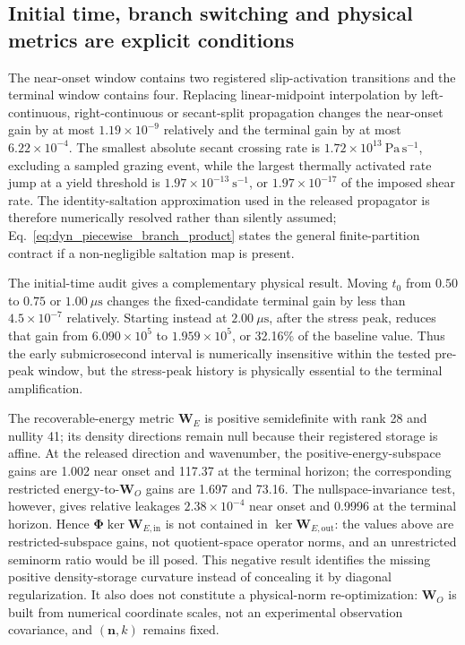 \subsection{Initial time, branch switching and physical metrics are explicit conditions}

The near-onset window contains two registered slip-activation transitions and
the terminal window contains four.  Replacing linear-midpoint interpolation by
left-continuous, right-continuous or secant-split propagation changes the
near-onset gain by at most $1.19\times10^{-9}$ relatively and the terminal
gain by at most $6.22\times10^{-4}$.  The smallest absolute secant crossing
rate is $1.72\times10^{13}~\mathrm{Pa\,s^{-1}}$, excluding a sampled grazing
event, while the largest thermally activated rate jump at a yield threshold is
$1.97\times10^{-13}~\mathrm{s^{-1}}$, or $1.97\times10^{-17}$ of the imposed
shear rate.  The identity-saltation approximation used in the released
propagator is therefore numerically resolved rather than silently assumed;
Eq.~\eqref{eq:dyn_piecewise_branch_product} states the general finite-partition
contract if a non-negligible saltation map is present.

The initial-time audit gives a complementary physical result.  Moving $t_0$
from $0.50$ to $0.75$ or $1.00~\mu\mathrm s$ changes the fixed-candidate
terminal gain by less than $4.5\times10^{-7}$ relatively.  Starting instead at
$2.00~\mu\mathrm s$, after the stress peak, reduces that gain from
$6.090\times10^5$ to $1.959\times10^5$, or 32.16\% of the baseline value.
Thus the early submicrosecond interval is numerically insensitive within the
tested pre-peak window, but the stress-peak history is physically essential to
the terminal amplification.

The recoverable-energy metric $\boldsymbol W_E$ is positive semidefinite with
rank 28 and nullity 41; its density directions remain null because their
registered storage is affine.  At the released direction and wavenumber, the
positive-energy-subspace gains are 1.002 near onset and 117.37 at the terminal
horizon; the corresponding restricted energy-to-$\boldsymbol W_O$ gains are
1.697 and 73.16.  The nullspace-invariance test, however, gives relative
leakages $2.38\times10^{-4}$ near onset and 0.9996 at the terminal horizon.
Hence $\boldsymbol\Phi\ker\boldsymbol W_{E,\mathrm{in}}$ is not contained in
$\ker\boldsymbol W_{E,\mathrm{out}}$: the values above are restricted-subspace
gains, not quotient-space operator norms, and an unrestricted seminorm ratio
would be ill posed.  This negative result identifies the missing positive
density-storage curvature instead of concealing it by diagonal
regularization.  It also does not constitute a physical-norm re-optimization:
$\boldsymbol W_O$ is built from numerical coordinate scales, not an
experimental observation covariance, and $(\boldsymbol n,k)$ remains fixed.

